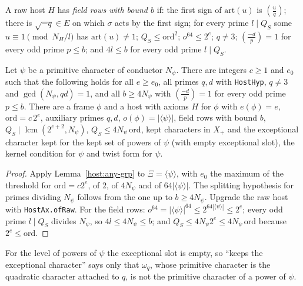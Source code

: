 \begin{definition}\label{host:field-rows}
A raw host $H$ has \emph{field rows with bound $b$} if: the first sign of
$\mathrm{art}(u)$ is $\left(\frac uq\right)$; there is $\sqrt{-q}\in E$ on
which $\sigma$ acts by the first sign; for every prime $l\mid Q_S$ some
$u\equiv1\pmod{N_H/l}$ has $\mathrm{art}(u)\ne1$; $Q_S\le\mathrm{ord}^2$;
$o^{64}\le2^e$; $q\ne3$; $\left(\frac{-d}{p}\right)=1$ for every odd prime
$p\le b$; and $4l\le b$ for every odd prime $l\mid Q_S$.
\end{definition}

\begin{theorem}\label{host:field-chi}
Let $\psi$ be a primitive character of conductor $N_{\psi}$. There are
integers $c\ge1$ and $e_0$ such that the following holds for all $e\ge e_0$,
all primes $q,d$ with \texttt{HostHyp}, $q\ne3$ and $\gcd(N_{\psi},qd)=1$, and
all $b\ge4N_{\psi}$ with $\left(\frac{-d}{p}\right)=1$ for every odd prime
$p\le b$. There are a frame $\phi$ and a host with axioms $H$ for $\phi$
with $e(\phi)=e$, $\mathrm{ord}=c\,2^e$, auxiliary primes $q,d$,
$o(\phi)=|\langle\psi\rangle|$, field rows with bound $b$,
$Q_S\mid\operatorname{lcm}(2^{e+2},N_{\psi})$, $Q_S\le4N_{\psi}\,\mathrm{ord}$,
kept characters in $X_+$ and the exceptional character kept for the kept
set of powers of $\psi$ (with empty exceptional slot), the kernel condition
for $\psi$ and twist form for $\psi$.
\end{theorem}
\begin{proof}
Apply Lemma~\ref{host:any-grp} to $\Xi=\langle\psi\rangle$, with $e_0$
the maximum of the threshold for $\mathrm{ord}=c2^e$, of $2$, of
$4N_{\psi}$ and of $64|\langle\psi\rangle|$. The splitting hypothesis for
primes dividing $N_{\psi}$ follows from the one up to $b\ge4N_{\psi}$. Upgrade
the raw host with \texttt{HostAx.ofRaw}. For the field rows:
$o^{64}=|\langle\psi\rangle|^{64}\le2^{64|\langle\psi\rangle|}\le2^e$;
every odd prime $l\mid Q_S$ divides $N_{\psi}$, so $4l\le4N_{\psi}\le b$; and
$Q_S\le4N_{\psi}2^e\le4N_{\psi}\,\mathrm{ord}$ because $2^e\le\mathrm{ord}$.
\end{proof}

\begin{remark}\label{host:rem-exc}
For the level of powers of $\psi$ the exceptional slot is empty, so
``keeps the exceptional character'' says only that $\omega_q$, whose
primitive character is the quadratic character attached to $q$, is not
the primitive character of a power of $\psi$.
\end{remark}


